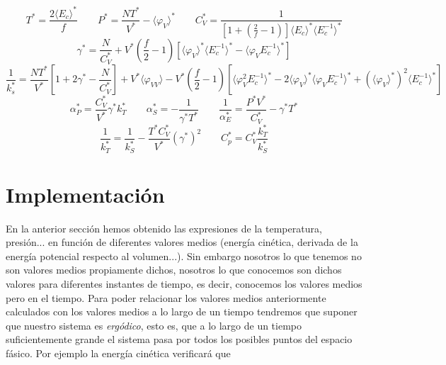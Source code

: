 \documentclass[11pt]{article} %
\newcommand{\parentesis}[1]{\left( #1  \right)}
\newcommand{\ccorchetes}[1]{\left[ #1  \right]}
\newcommand{\dquad}{\quad \quad}
\newcommand{\Ec}{\langle E_c \rangle}
\newcommand{\Ecinv}{\langle E_c^{-1} \rangle}
\newcommand{\varphiV}{\langle \varphi_V \rangle}
\newcommand{\varphiVV}{\langle \varphi_{VV}\rangle}
\newcommand{\varphiVEcinv}{\langle \varphi_V E_c^{-1} \rangle}
\newcommand{\varphiVVEcinv}{ \langle \varphi_V^2 E_c^{-1} \rangle}
\begin{document}
\begin{equation*}
	T^* = \frac{2\Ec^*}{f} \dquad P^* = \frac{NT^*}{V^*} - \langle \varphi_V \rangle^* \dquad C_V^* = \frac{1}{\ccorchetes{1+\parentesis{\frac{2}{f}-1}}\Ec^* \Ecinv^*}   
\end{equation*}
\begin{equation*}
	\gamma^*  = \frac{N}{C_V^*} + V^* \parentesis{\frac{f}{2} -1} \ccorchetes{\varphiV^* \Ecinv^* - \varphiVEcinv^*}  
\end{equation*}
\begin{equation*}
	\frac{1}{k_s^*} = \frac{NT^*}{V^*} \ccorchetes{1+2\gamma^* - \frac{N}{C_V^*}} + V^* \varphiVV  - V^*\parentesis{\frac{f}{2} -1} \ccorchetes{\varphiVVEcinv^* - 2 \varphiV^* \varphiVEcinv^* + (\varphiV^*)^2 \Ecinv^*}
\end{equation*}
\begin{equation*}
	\alpha_P^* = \frac{C_V^*}{V^*} \gamma^* k_T^* \dquad \alpha_S^* = - \frac{1}{\gamma^* T^*} \dquad \frac{1}{\alpha_E^*} = \frac{P^*V^*}{C_V^*} - \gamma^* T^* 
\end{equation*}
\begin{equation*}
	\frac{1}{k_T^*} = \frac{1}{k_S^*} - \frac{T^*C_V^*}{V^*} (\gamma^*)^2 \dquad C_p^* = C_V^* \frac{k_T^*}{k_S^*}
\end{equation*}

\section{Implementación} \label{Sec:04}

En la anterior sección hemos obtenido las expresiones de la temperatura, presión... en función de diferentes valores medios (energía cinética, derivada de la energía potencial respecto al volumen...). Sin embargo nosotros lo que tenemos no son valores medios propiamente dichos, nosotros lo que conocemos son dichos valores para diferentes instantes de tiempo, es decir, conocemos los valores medios pero en el tiempo. Para poder relacionar los valores medios anteriormente calculados con los valores medios a lo largo de un tiempo tendremos que suponer que nuestro sistema es \textit{ergódico}, esto es, que a lo largo de un tiempo suficientemente grande el sistema pasa por todos los posibles puntos del espacio fásico. Por ejemplo la energía cinética verificará que
\end{document}
